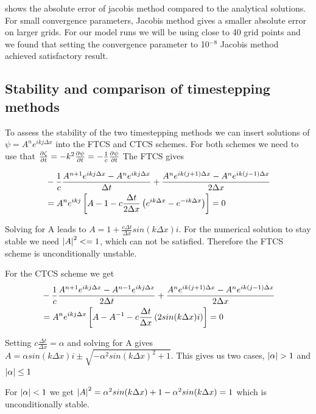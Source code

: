 shows the absolute error of jacobis method compared to the analytical solutions.
For small convergence parameters, Jacobis method gives a smaller
absolute error on larger grids.
For our model runs we will be using close to 40 grid points and we found that
setting the convergence parameter to 10$^{-8}$ Jacobis method achieved
satisfactory result.


\subsection{Stability and comparison of timestepping methods}

To assess the stability of the two timestepping methods we can insert solutions
of $\psi = A^n e^{ikj \Delta x}$ into the FTCS and CTCS schemes.
For both schemes we need to use that
$\pdv{\zeta}{t} = -k^2 \pdv{\psi}{t} = - \frac{1}{c} \pdv{\psi}{t}$
The FTCS gives

\begin{align}
  &-\frac{1}{c} \frac{A^{n+1} e^{ikj\Delta x} - A^n e^{ikj\Delta x}}{\Delta t} + \frac{A^n e^{ik(j+1)\Delta x} - A^n e^{ik(j-1)\Delta x}}{2\Delta x} \\
  &= A^n e^{ikj} \left[A - 1 - c\frac{\Delta t}{2 \Delta x} \left(e^{ik\Delta x} - e^{-ik\Delta x}\right)\right] = 0
\end{align}

Solving for A leads to $ A = 1 + \frac{c \Delta t}{\Delta x} sin(k\Delta x) i$.
For the numerical solution to stay stable we need $\abs{A}^2 <= 1$, which can
not be satisfied. Therefore the FTCS scheme is unconditionally unstable.

For the CTCS scheme we get
\begin{align}
  &-\frac{1}{c}\frac{A^{n+1} e^{ikj\Delta x} - A^{n-1} e^{ikj \Delta x}}{2 \Delta t} + \frac{A^n e^{ik(j+1) \Delta x} - A^{n} e^{ik(j-1)\Delta x}}{2 \Delta x} \\
  &= A^n e^{ikj\Delta x} \left[ A - A^{-1} - c\frac{\Delta t}{\Delta x} \left(2 sin(k\Delta x) i\right)\right] = 0
\end{align}

Setting $c\frac{\Delta t}{\Delta x} = \alpha$ and solving for A gives
$ A = \alpha sin(k\Delta x) i \pm \sqrt{-\alpha^2 sin(k\Delta x)^2 + 1}$.
This gives us two cases, $\abs{\alpha} > 1$ and $\abs{\alpha} \leq 1$


For $\abs{\alpha} < 1$ we get
$\abs{A}^2 = \alpha^2 sin(k\Delta x) + 1 - \alpha^2 sin(k\Delta x) = 1$
which is unconditionally stable.


